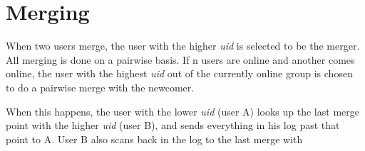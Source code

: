 \section{Merging}

When two users merge, the user with the higher \emph{uid} is selected to be
the merger. All merging is done on a pairwise basis. If n users are online 
and another comes online, the user with the highest \emph{uid} out of the currently
online group is chosen to do a pairwise merge with the newcomer.

When this happens, the user with the lower \emph{uid} (user A) looks up the last merge point
with the higher \emph{uid} (user B), and sends everything in his log past that point to
A. User B also scans back in the log to the last merge with 

